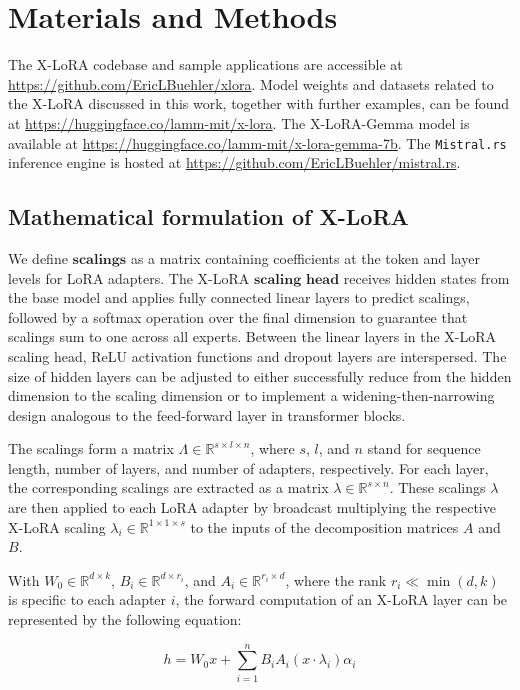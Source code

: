 \section{Materials and Methods}

The X-LoRA codebase and sample applications are accessible at \url{https://github.com/EricLBuehler/xlora}. Model weights and datasets related to the X-LoRA discussed in this work, together with further examples, can be found at \url{https://huggingface.co/lamm-mit/x-lora}. The X-LoRA-Gemma model is available at \url{https://huggingface.co/lamm-mit/x-lora-gemma-7b}. The \texttt{Mistral.rs} inference engine is hosted at \url{https://github.com/EricLBuehler/mistral.rs}.

\subsection{Mathematical formulation of X-LoRA} We define $\mathbf{scalings}$ as a matrix containing coefficients at the token and layer levels for LoRA adapters. The X-LoRA $\mathbf{scaling}$ $\mathbf{head}$ receives hidden states from the base model and applies fully connected linear layers to predict scalings, followed by a softmax operation over the final dimension to guarantee that scalings sum to one across all experts. Between the linear layers in the X-LoRA scaling head, ReLU activation functions and dropout layers are interspersed. The size of hidden layers can be adjusted to either successfully reduce from the hidden dimension to the scaling dimension or to implement a widening-then-narrowing design analogous to the feed-forward layer in transformer blocks.

The scalings form a matrix $\Lambda \in \mathbb{R}^{s \times l \times n}$, where $s$, $l$, and $n$ stand for sequence length, number of layers, and number of adapters, respectively. For each layer, the corresponding scalings are extracted as a matrix $\lambda \in \mathbb{R}^{s \times n}$. These scalings $\lambda$ are then applied to each LoRA adapter by broadcast multiplying the respective X-LoRA scaling $\lambda_i \in \mathbb{R}^{1 \times 1 \times s}$ to the inputs of the decomposition matrices $A$ and $B$.

With $W_0 \in \mathbb{R}^{d \times k}$, $B_i \in \mathbb{R}^{d \times r_i}$, and $A_i \in \mathbb{R}^{r_i \times d}$, where the rank $r_i \ll \min(d,k)$ is specific to each adapter $i$, the forward computation of an X-LoRA layer can be represented by the following equation:

\begin{equation}
    h = W_0x + \sum_{i=1}^{n} B_iA_i(x \cdot  \lambda_i) \alpha_i
\end{equation}

